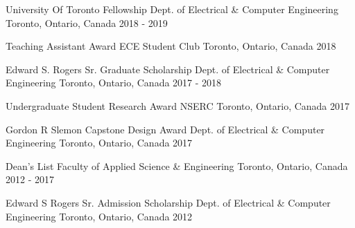 \begin{cvhonors}

  \cvhonor
    {University Of Toronto Fellowship} %
    {Dept. of Electrical \& Computer Engineering} %
    {Toronto, Ontario, Canada} %
    {2018 - 2019} %

  \cvhonor
    {Teaching Assistant Award} %
    {ECE Student Club} %
    {Toronto, Ontario, Canada} %
    {2018} %

  \cvhonor
    {Edward S. Rogers Sr. Graduate Scholarship} %
    {Dept. of Electrical \& Computer Engineering} %
    {Toronto, Ontario, Canada} %
    {2017 - 2018} %

  \cvhonor
    {Undergraduate Student Research Award} %
    {NSERC} %
    {Toronto, Ontario, Canada} %
    {2017} %

  \cvhonor
    {Gordon R Slemon Capstone Design Award} %
    {Dept. of Electrical \& Computer Engineering} %
    {Toronto, Ontario, Canada} %
    {2017} %

  \cvhonor
    {Dean's List} %
    {Faculty of Applied Science \& Engineering} %
    {Toronto, Ontario, Canada} %
    {2012 - 2017} %
				
  \cvhonor
    {Edward S Rogers Sr. Admission Scholarship} %
    {Dept. of Electrical \& Computer Engineering} %
    {Toronto, Ontario, Canada} %
    {2012} %
		
\end{cvhonors}
